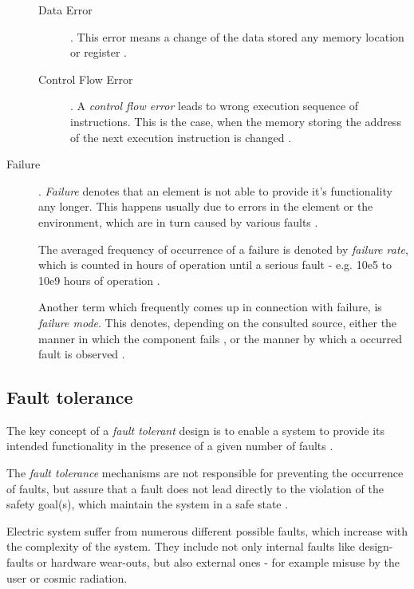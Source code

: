 \begin{description}
	\begin{description}
	\item [Data Error] .
	This error means a change of the data stored any memory location or register \cite{elattar2007}.

	\item [Control Flow Error] .
	A \emph{control flow error} leads to wrong execution sequence of instructions. This is the case, when the memory storing the address of the next execution instruction is changed \cite{elattar2007}.
	\end{description}

\item [Failure] .
\emph{Failure} denotes that an element is not able to provide it's functionality any longer. This happens usually due to errors in the element or the environment, which are in turn caused by various faults \cite{iso26262:1} \cite{nelson} \cite{autosar_glossary}.

The averaged frequency of occurrence of a failure is denoted by \emph{failure rate}, which is counted in hours of operation until a serious fault - e.g. 10e5 to 10e9 hours of operation \cite{rodrigues2011}.

Another term which frequently comes up in connection with failure, is \emph{failure mode}. This denotes, depending on the consulted source, either the manner in which the component fails \cite{international2006analysis}, or the manner by which a occurred fault is observed \cite{mil1980}.
\end{description}


\subsection{Fault tolerance}

\label{ch:fault_tolerance}

The key concept of a \emph{fault tolerant} design is to enable a system to provide its intended functionality in the presence of a given number of faults \cite{nelson}.

The \emph{fault tolerance} mechanisms are not responsible for preventing the occurrence of faults, but assure that a fault does not lead directly to the violation of the safety goal(s), which maintain the system in a safe state \cite{iso26262:1}.

Electric system suffer from numerous different possible faults, which increase with the complexity of the system. They include not only internal faults like design-faults or hardware wear-outs, but also external ones - for example misuse by the user or cosmic radiation.

